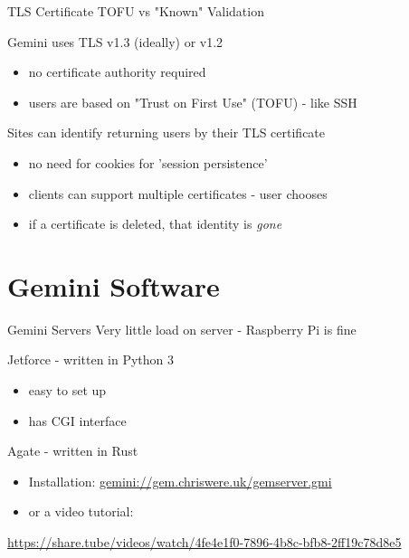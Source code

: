 \documentclass[presentation, 11pt,  aspectratio=169]{beamer}
\begin{document}
\begin{frame}[label={sec:orgbe06114}]{TLS Certificate TOFU vs "Known" Validation}
\begin{block}{Gemini uses TLS v1.3 (ideally) or v1.2}
\begin{itemize}
\item no certificate authority required\\
\item users are based on "Trust on First Use" (TOFU) - like SSH\\
\end{itemize}

\pause
\end{block}
\begin{block}{Sites can identify returning users by their TLS certificate}
\begin{itemize}
\item no need for cookies for 'session persistence'\\
\item clients can support multiple certificates - user chooses\\
\item if a certificate is deleted, that identity is \emph{gone}\\
\end{itemize}
\end{block}
\end{frame}

\section*{Gemini Software}
\label{sec:orgce8442a}
\begin{frame}[label={sec:org56834c9}]{Gemini Servers}
Very little load on server - Raspberry Pi is fine\\

\begin{block}{Jetforce - written in Python 3}
\begin{itemize}
\item easy to set up\\
\item has CGI interface\\
\end{itemize}
\end{block}

\begin{block}{Agate - written in Rust}
\begin{itemize}
\item Installation: \href{gemini://gem.chriswere.uk/gemserver.gmi}{gemini://gem.chriswere.uk/gemserver.gmi}\\
\item or a video tutorial:\\
\end{itemize}
\begin{small}
\url{https://share.tube/videos/watch/4fe4e1f0-7896-4b8c-bfb8-2ff19c78d8e5}\\
\end{small}
\end{block}
\end{frame}
\end{document}
